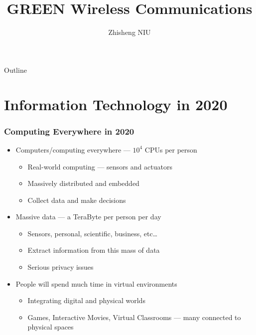 \documentclass[usepdftitle=false]{beamer}
\title
{\textcolor{green!50!black}{GREEN} \alert{Wireless Communications}}
\author[short] %
{Zhisheng NIU}
\institute[short] %
{
\niulab\\
Tsinghua University, Beijing, China
}
\date{}
\begin{document}
{
\begin{frame}
\titlepage
\end{frame}
}

\begin{frame}{Outline}
\tableofcontents
\end{frame}




\section{Information Technology in 2020}

\begin{frame}
  \frametitle{Computing Everywhere in 2020}
  \begin{itemize}
    \item Computers/computing everywhere --- $10^4$ CPUs per person
      \begin{itemize}
        \item Real-world computing --- sensors and actuators
        \item Massively distributed and embedded
        \item Collect data and make decisions
      \end{itemize}
    \item Massive data --- a TeraByte per person per day
      \begin{itemize}
        \item Sensors, personal, scientific, business, etc\ldots
        \item Extract information from this mass of data
        \item Serious privacy issues
      \end{itemize}
    \item People will spend much time in virtual environments
      \begin{itemize}
        \item Integrating digital and physical worlds
        \item Games, Interactive Movies, Virtual Classrooms --- many connected
        to physical spaces
      \end{itemize}
  \end{itemize}
\end{frame}
\end{document}
